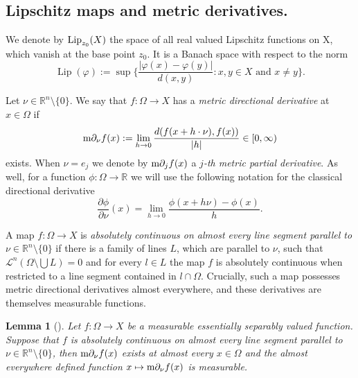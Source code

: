 \documentclass[reqno]{amsart}
\newtheorem{lem}[thm]{Lemma}
\begin{document}
\subsection{Lipschitz maps and metric derivatives.}


We denote by $\textnormal{Lip}_{z_0}(X)$ the space of all
real valued Lipschitz functions on X, which vanish at the base point $z_0$.
It is a Banach space with respect to the norm
\[
\operatorname{Lip}(\varphi) := \sup\bigg\{ \frac{|\varphi(x) - \varphi(y)|}{d(x,y)} \colon x,y\in X \text{ and }  x\ne y \bigg\}.
\]

Let $\nu\in \mathbb R^n\setminus\{0\}$. We say that $f\colon \Omega \to X$ has a \emph{metric directional derivative} at $x\in \Omega$ if 
\begin{equation}
    \textnormal{m}\partial_{\nu} f(x):=\lim_{h\to 0} \frac{d(f(x+h\cdot \nu),f(x))}{|h|}\in [0,\infty)
\end{equation}
exists. When $\nu = e_j$ we denote by $\textnormal{m}\partial_j f(x)$ a \emph{$j$-th metric partial derivative}.
As well, for a function $\phi:\Omega\to\mathbb R$ we will use the following notation for the classical directional derivative
\[
 \frac{\partial\phi}{\partial\nu}(x) = \lim_{h\to 0} \frac{\phi(x+h\nu) - \phi(x)}{h}.
\]

A map $f\colon \Omega \to X$ is \emph{absolutely continuous on almost every line segment parallel to $\nu\in \mathbb R^n\setminus\{0\}$} 
if there is a family of lines $L$, which are parallel to $\nu$, such that $\mathcal{L}^n(\Omega\setminus\bigcup L)=0$ and for every $l\in L$ the map $f$ is absolutely continuous when restricted to a line segment contained in $l\cap \Omega$.
Crucially, such a map possesses metric directional derivatives almost everywhere, and these derivatives are themselves measurable functions.
\begin{lem}[{\cite[Lemma 2.4]{CJP22}}]\label{lemma2.4}
Let $f:\Omega\to X$ be a measurable essentially separably valued function.
Suppose that $f$ is absolutely continuous on almost every line segment parallel to $\nu\in \mathbb R^n\setminus\{0\}$,
then $\textnormal{m}\partial_\nu f(x)$ exists at almost every $x\in \Omega$ and the almost everywhere defined function $x\mapsto \textnormal{m}\partial_\nu f(x)$ is measurable.
\end{lem}
\end{document}
